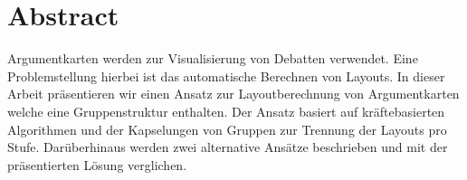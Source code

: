 \chapter*{Abstract}
Argumentkarten werden zur Visualisierung von Debatten verwendet. Eine Problemstellung hierbei ist das automatische Berechnen von Layouts.
In dieser Arbeit präsentieren wir einen Ansatz zur Layoutberechnung von Argumentkarten welche eine Gruppenstruktur enthalten. 
Der Ansatz basiert auf kräftebasierten Algorithmen und der Kapselungen von Gruppen zur Trennung der Layouts pro Stufe. Darüberhinaus werden zwei alternative Ansätze beschrieben
und mit der präsentierten Lösung verglichen.